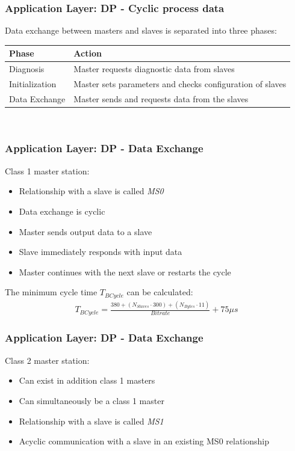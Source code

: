 \documentclass{beamer}
\begin{document}
\begin{frame}
  \frametitle{Application Layer: DP - Cyclic process data}
  Data exchange between masters and slaves is separated into three
  phases:~\cite{profibusmanual}
  \center
  \footnotesize
  \begin{tabular}[h]{l|l}
    \textbf{Phase}  & \textbf{Action} \\
    \hline
    Diagnosis       & Master requests diagnostic data from slaves \\
    Initialization  & Master sets parameters and checks configuration of slaves \\
    Data Exchange   & Master sends and requests data from the slaves
  \end{tabular} \\
\end{frame}

\begin{frame}
  \frametitle{Application Layer: DP - Data Exchange}
  Class 1 master station:
  \begin{itemize}
    \item Relationship with a slave is called \textit{MS0}
    \item Data exchange is cyclic
    \item Master sends output data to a slave
    \item Slave immediately responds with input data
    \item Master continues with the next slave or restarts the cycle
  \end{itemize}
  \vspace{10pt}
  The minimum cycle time $T_{BCycle}$ can be calculated:
  \begin{align}
    T_{BCycle} = \frac{380 + (N_{Slaves} \cdot 300) + (N_{Bytes} \cdot 11)}{Bitrate} + 75
    \mu s
    \label{minimumcycletime}
  \end{align}
\end{frame}

\begin{frame}
  \frametitle{Application Layer: DP - Data Exchange}
  Class 2 master station:
  \begin{itemize}
    \item Can exist in addition class 1 masters
    \item Can simultaneously be a class 1 master
    \item Relationship with a slave is called \textit{MS1}
    \item Acyclic communication with a slave in an existing MS0 relationship
  \end{itemize}
\end{frame}
\end{document}

